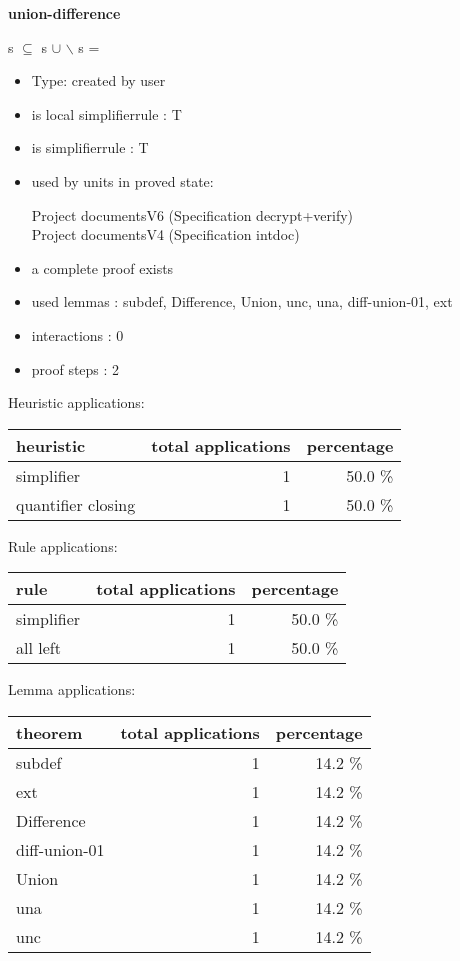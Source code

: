 \documentclass[a4paper]{article}
\begin{document}
{\LARGE\bf union-difference}\label{lemma-union-difference}

\medskip

 \Fol s $\subseteq$  \Imp s $\cup$  $\backslash$ s = 

\begin{itemize}

\item Type: created by user

\item is local simplifierrule : T
\item is simplifierrule : T
\item used by units in proved state:

Project documentsV6 (Specification decrypt+verify) \\
Project documentsV4 (Specification intdoc)
\item       a complete proof exists
\item       used lemmas  : subdef, Difference, Union, unc, una, diff-union-01, ext
\item       interactions : 0
\item       proof steps  : 2
\end{itemize}

\medskip


Heuristic applications:

\begin{supertabular}{l|r|r}
heuristic	& total applications & percentage \\ \hline
simplifier & 1 & 50.0 \% \\
quantifier closing & 1 & 50.0 \% \\

\end{supertabular}

Rule applications:

\begin{supertabular}{l|r|r}
rule	        & total applications & percentage \\ \hline
simplifier & 1 & 50.0 \% \\
all left & 1 & 50.0 \% \\

\end{supertabular}

Lemma applications:

\begin{supertabular}{l|r|r}
theorem	        & total applications & percentage \\ \hline
subdef & 1 & 14.2 \% \\
ext & 1 & 14.2 \% \\
Difference & 1 & 14.2 \% \\
diff-union-01 & 1 & 14.2 \% \\
Union & 1 & 14.2 \% \\
una & 1 & 14.2 \% \\
unc & 1 & 14.2 \% \\

\end{supertabular}
\pagebreak
\end{document}
